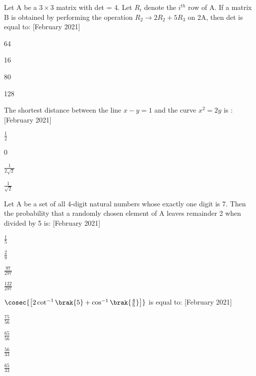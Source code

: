 \iffalse
\title{2021}
\author{EE24BTECH11063}
\section{mcq-single}
\fi
\item Let A be a $3 \times 3$ matrix with det = 4. Let $R_i$ denote the $i^{th}$ row of A. If a matrix B is obtained by performing the operation $R_2 \rightarrow 2R_2 + 5R_3$ on 2A, then det is equal to: \hfill{[February 2021]}
    \begin{enumerate}
    \begin{multicols}{4}
    \item 64
    \item 16
    \item 80
    \item 128
    \end{multicols}
        \end{enumerate}
        \item The shortest distance between the line $x-y=1$ and the curve $x^2=2y$ is : \hfill{[February 2021]}
        \begin{enumerate}
        \begin{multicols}{4}
            \item $\frac{1}{2}$
            \item 0
            \item $\frac{1}{2\sqrt{2}}$
            \item $\frac{1}{\sqrt{2}}$
            \end{multicols}
        \end{enumerate}
\item Let A be a set of all 4-digit natural numbers whose exactly one digit is 7. Then the probability that a randomly chosen element of A leaves remainder 2 when divided by 5 is: \hfill{[February 2021]}
        \begin{enumerate}
        \begin{multicols}{4}
        \item $\frac{1}{5}$
        \item $\frac{2}{9}$
        \item $\frac{97}{297}$
        \item $\frac{122}{297}$
        \end{multicols}
        \end{enumerate}
    \item $\cosec{\left[2\cot^{-1}{\brak{5}}+\cos^{-1}{\brak{\frac{4}{5}}}\right]}$ is equal to: \hfill{[February 2021]}
    \begin{enumerate}
        \begin{multicols}{4}
        \item $\frac{75}{56}$
        \item $\frac{65}{56}$
        \item $\frac{56}{33}$
        \item $\frac{65}{33}$
        \end{multicols}
        \end{enumerate}


